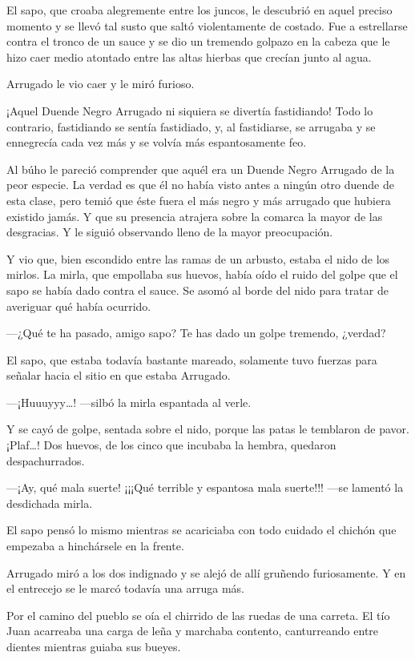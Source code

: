\documentclass{barcodevapor3pags}
\begin{document}
El sapo, que croaba alegremente entre los juncos, le descubrió en aquel
preciso momento y se llevó tal susto que saltó violentamente de costado.
Fue a estrellarse contra el tronco de un sauce y se dio un tremendo
golpazo en la cabeza que le hizo caer medio atontado entre las altas
hierbas que crecían junto al agua.

Arrugado le vio caer y le miró furioso.

¡Aquel Duende Negro Arrugado ni siquiera se divertía fastidiando! Todo
lo contrario, fastidiando se sentía fastidiado, y, al fastidiarse, se
arrugaba y se ennegrecía cada vez más y se volvía más espantosamente
feo.

Al búho le pareció comprender que aquél era un Duende Negro Arrugado de
la peor especie. La verdad es que él no había visto antes a ningún otro
duende de esta clase, pero temió que éste fuera el más negro y más
arrugado que hubiera existido jamás. Y que su presencia atrajera sobre
la comarca la mayor de las desgracias. Y le siguió observando lleno de
la mayor preocupación.

Y vio que, bien escondido entre las ramas de un arbusto, estaba el nido
de los mirlos. La mirla, que empollaba sus huevos, había oído el ruido
del golpe que el sapo se había dado contra el sauce. Se asomó al borde
del nido para tratar de averiguar qué había ocurrido.

---¿Qué te ha pasado, amigo sapo? Te has dado un golpe tremendo,
¿verdad?

El sapo, que estaba todavía bastante mareado, solamente tuvo fuerzas
para señalar hacia el sitio en que estaba Arrugado.

---¡Huuuyyy\ldots! ---silbó la mirla espantada al verle.

Y se cayó de golpe, sentada sobre el nido, porque las patas le temblaron
de pavor. ¡Plaf\ldots! Dos huevos, de los cinco que incubaba la hembra,
quedaron despachurrados.

---¡Ay, qué mala suerte! ¡¡¡Qué terrible y espantosa mala suerte!!!
---se lamentó la desdichada mirla.

El sapo pensó lo mismo mientras se acariciaba con todo cuidado el
chichón que empezaba a hinchársele en la frente.


Arrugado miró a los dos indignado y se alejó de allí gruñendo
furiosamente. Y en el entrecejo se le marcó todavía una arruga más.

Por el camino del pueblo se oía el chirrido de las ruedas de una
carreta. El tío Juan acarreaba una carga de leña y marchaba contento,
canturreando entre dientes mientras guiaba sus bueyes.
\end{document}

